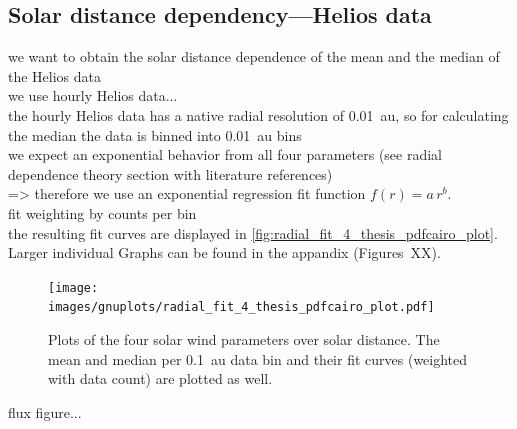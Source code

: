 \subsection{Solar distance dependency---Helios data}

we want to obtain the solar distance dependence of the mean and the median of the Helios data\\

we use hourly Helios data...\\
the hourly Helios data has a native radial resolution of 0.01~au, so for calculating the median the data is binned into 0.01~au bins\\

we expect an exponential behavior from all four parameters (see radial dependence theory section with literature references)\\
=> therefore we use an exponential regression fit function $f(r) = a\,r^b$.\\
fit weighting by counts per bin\\

the resulting fit curves are displayed in \autoref{fig:radial_fit_4_thesis_pdfcairo_plot}. Larger individual Graphs can be found in the appandix (Figures~XX).%
\begin{figure}[htb]
	\centering
	\texttt{[image: images/gnuplots/radial\_fit\_4\_thesis\_pdfcairo\_plot.pdf]}
	\caption{Plots of the four solar wind parameters over solar distance. The mean and median per 0.1~au data bin and their fit curves (weighted with data count) are plotted as well.}
	\label{fig:radial_fit_4_thesis_pdfcairo_plot}
\end{figure}

flux figure...\\



